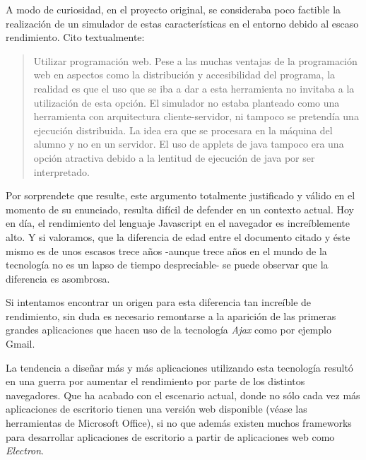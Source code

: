 A modo de curiosidad, en el proyecto original, se consideraba poco factible la realización de 
un simulador de estas características en el entorno debido al escaso rendimiento. Cito textualmente:

\begin{quotation}
Utilizar programación web. Pese a las muchas ventajas de la programación
web en aspectos como la distribución y accesibilidad del programa, la realidad
es que el uso que se iba a dar a esta herramienta no invitaba a la utilización de
esta opción. El simulador no estaba planteado como una herramienta con
arquitectura cliente-servidor, ni tampoco se pretendía una ejecución distribuida.
La idea era que se procesara en la máquina del alumno y no en un servidor. El
uso de applets de java tampoco era una opción atractiva debido a la lentitud de
ejecución de java por ser interpretado.
\end{quotation} \cite{SIMDE}

\bigskip
Por sorprendete que resulte, este argumento totalmente justificado y válido en el momento
de su enunciado, resulta difícil de defender en un contexto actual. Hoy en día,
el rendimiento del lenguaje Javascript en el navegador es increíblemente alto. Y si valoramos, que 
la diferencia de edad entre el documento citado y éste mismo es de unos escasos trece años -aunque 
trece años en el mundo de la tecnología no es un lapso de tiempo despreciable- se puede observar
que la diferencia es asombrosa.
 
\bigskip
Si intentamos encontrar un origen para esta diferencia tan increíble de rendimiento, sin duda
es necesario remontarse a la aparición de las primeras grandes aplicaciones que hacen uso de la tecnología
\textit{Ajax} como por ejemplo Gmail.\cite{EvolutionJavascript}

\bigskip
La tendencia a diseñar más y más aplicaciones utilizando esta tecnología resultó en una guerra por aumentar el rendimiento por parte de los distintos navegadores. Que ha 
acabado con el escenario actual, donde no sólo cada vez más aplicaciones de escritorio tienen una versión web 
disponible (véase las herramientas de Microsoft Office), si no que además existen muchos frameworks para 
desarrollar aplicaciones de escritorio a partir de aplicaciones web como \textit{Electron}.\cite{Electron}
